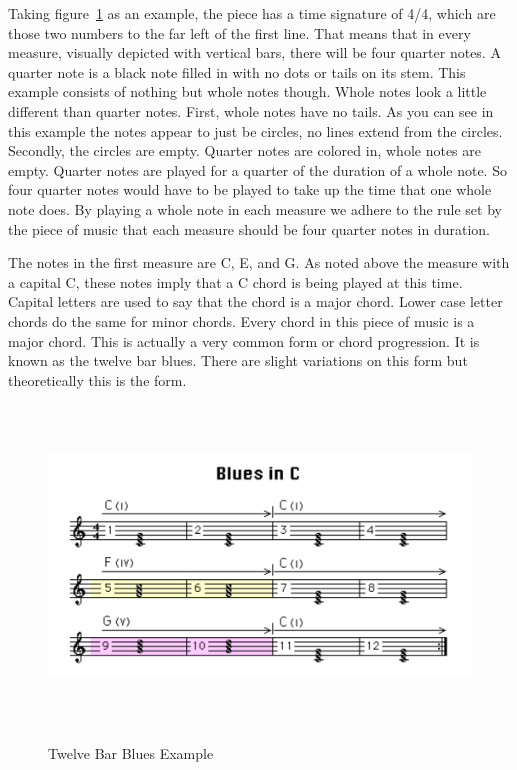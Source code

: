\documentclass[12pt]{ucthesis}
\newcommand{\captionfonts}{\small\bf\ssp}
\begin{document}
Taking figure~\ref{fig:blues-example} as an example, the piece has a time signature of 4/4, which are those two numbers to the far left of the first line. That means that in every measure, visually depicted with vertical bars, there will be four quarter notes. A quarter note is a black note filled in with no dots or tails on its stem. This example consists of nothing but whole notes though. Whole notes look a little different than quarter notes. First, whole notes have no tails. As you can see in this example the notes appear to just be circles, no lines extend from the circles. Secondly, the circles are empty. Quarter notes are colored in, whole notes are empty. Quarter notes are played for a quarter of the duration of a whole note. So four quarter notes would have to be played to take up the time that one whole note does. By playing a whole note in each measure we adhere to the rule set by the piece of music that each measure should be four quarter notes in duration.

The notes in the first measure are C, E, and G. As noted above the measure with a capital C, these notes imply that a C chord is being played at this time. Capital letters are used to say that the chord is a major chord. Lower case letter chords do the same for minor chords. Every chord in this piece of music is a major chord. This is actually a very common form or chord progression. It is known as the twelve bar blues. There are slight variations on this form but theoretically this is the form. 

\begin{figure}
\includegraphics[height=85mm]{blues-example.pdf}
\captionfonts
\caption[Twelve Bar Blues Example]{Twelve Bar Blues Example}
\label{fig:blues-example}
\end{figure}
\end{document}
